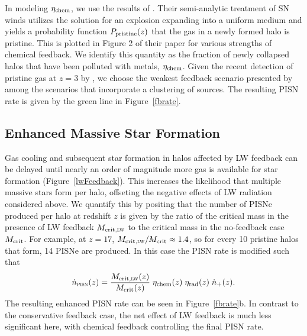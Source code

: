 \documentclass{thesis}
\newcommand{\RefFig}[1]{\mbox{Figure~\ref{#1}}}
\begin{document}
In modeling $\eta_{\rm chem}$, we use the results of
\citet{FurlanettoLoeb2005}.  Their semi-analytic treatment of SN winds
utilizes the \citet{Sedov1959} solution for an explosion expanding
into a uniform medium and yields a probability function $P_{\rm
  pristine}(z)$ that the gas in a newly formed halo is pristine.  This
is plotted in Figure 2 of their paper for various strengths of
chemical feedback.  We identify this quantity as the fraction of newly
collapsed halos that have been polluted with metals, $\eta_{\rm
  chem}$.  Given the recent detection of pristine gas at $z = 3$ by
\citet{FumagalliOMearaProchaska2011}, we choose the weakest feedback
scenario presented by \citet{FurlanettoLoeb2005} among the scenarios
that incorporate a clustering of sources. The resulting PISN rate is
given by the green line in \RefFig{fbrate}.

\subsection{Enhanced Massive Star Formation}
Gas cooling and subsequent star formation in halos affected by LW
feedback can be delayed until nearly an order of magnitude more gas is
available for star formation (\RefFig{lwFeedback}). This increases the
likelihood that multiple massive stars form per halo, offseting the
negative effects of LW radiation considered above.  We quantify this
by positing that the number of PISNe produced per halo at redshift $z$
is given by the ratio of the critical mass in the presence of LW
feedback $M_{\rm crit, \textsc{lw}}$ to the critical mass in the
no-feedback case $M_{\rm crit}$.  For example, at $z=17$, $M_{\rm
  crit, \textsc{lw}} / M_{\rm crit} \approx 1.4$, so for every 10
pristine halos that form, 14 PISNe are produced.  In this case the
PISN rate is modified such that
\begin{equation}
\dot{n}_{\textsc{pisn}}(z) = \frac{M_{\rm crit, \textsc{lw}}(z)}{M_{\rm crit}(z)} \;
\eta_{\rm chem}(z) \; \eta_{\rm rad}(z) \; \dot{n}_{+}(z).
\label{pisnrate2}
\end{equation}
The resulting enhanced PISN rate can be seen in \RefFig{fbrate}b.  In
contrast to the conservative feedback case, the net effect of LW
feedback is much less significant here, with chemical feedback
controlling the final PISN rate.
\end{document}
